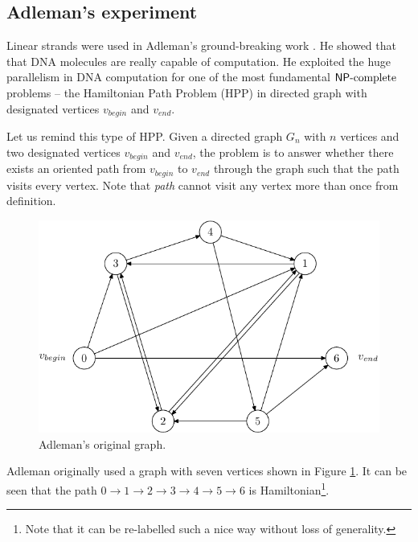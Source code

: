 	\subsection{Adleman's experiment}
	\label{sec:adleman}
		
		Linear strands were used in Adleman's ground-breaking work \cite{adleman94}. He showed that that DNA molecules are really capable of computation. He exploited the huge parallelism in DNA computation for one of the most fundamental $\mathsf{NP}\textnormal{-complete}$ problems -- the Hamiltonian Path Problem (HPP) in directed graph with designated vertices $v_{begin}$ and $v_{end}$.
		
		Let us remind this type of HPP. Given a directed graph $G_n$ with $n$ vertices and two designated vertices $v_{begin}$ and $v_{end}$, the problem is to answer whether there exists an oriented path from $v_{begin}$ to $v_{end}$ through the graph such that the path visits every vertex. Note that {\em path} cannot visit any vertex more than once from definition.
		
		\begin{figure}[h]
		\begin{center}
			\includegraphics{./figures/adleman_graph.pdf}
			\caption{Adleman's original graph.}
			\label{fig:adleman_graph}
		\end{center}
		\end{figure}
		
		Adleman originally used a graph with seven vertices shown in Figure \ref{fig:adleman_graph}. It can be seen that the path $0 \rightarrow 1 \rightarrow 2 \rightarrow 3 \rightarrow 4 \rightarrow 5 \rightarrow 6$ is Hamiltonian\footnote{Note that it can be re-labelled such a nice way without loss of generality.}.
		
